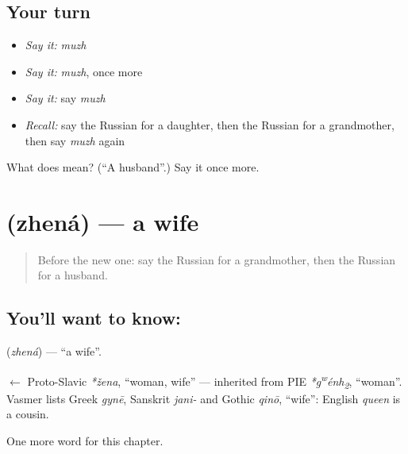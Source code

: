 \subsection*{Your turn}
\begin{itemize}
\raggedright
  \item \emph{Say it:} \emph{muzh}
  \item \emph{Say it:} \emph{muzh}, once more
  \item \emph{Say it:} say \emph{muzh}
  \item \emph{Recall:} say the Russian for a daughter, then the Russian for a grandmother, then say \emph{muzh} again
\end{itemize}

\begin{tcolorbox}[breakable,colback=teal!4,colframe=teal!35!black,title={Before you move on}]
What does  mean? (\textquotedblleft{}A husband\textquotedblright{}.) Say it once more.
\end{tcolorbox}
\section[\texorpdfstring{\ru{жена} (zhená)}{жена (zhená)}]{ (zhená) — a wife}

\label{lesson:RU-C35-wife}



\begin{quote}
Before the new one: say the Russian for a grandmother, then the Russian for a husband.
\end{quote}

\subsection*{You'll want to know: }
\textbf{} (\emph{zhená}) — \textquotedblleft{}a wife\textquotedblright{}.

\begin{cousinweb}
\textbf{} $\leftarrow$ Proto-Slavic \emph{*žena}, \textquotedblleft{}woman, wife\textquotedblright{} — inherited from PIE \emph{*g\textsuperscript{w}énh\textsubscript{2}}, \textquotedblleft{}woman\textquotedblright{}. Vasmer lists Greek \emph{gynē}, Sanskrit \emph{jani-} and Gothic \emph{qinō}, \textquotedblleft{}wife\textquotedblright{}: English \emph{queen} is a cousin.
\end{cousinweb}

\begin{grammarlens}[title={What you've built}]
One more word for this chapter.
\end{grammarlens}

